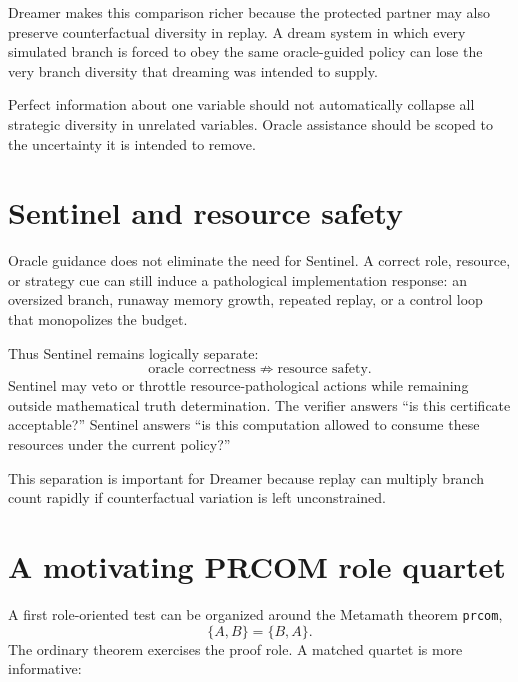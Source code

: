 Dreamer makes this comparison richer because the protected partner may also preserve counterfactual diversity in replay. A dream system in which every simulated branch is forced to obey the same oracle-guided policy can lose the very branch diversity that dreaming was intended to supply.

\begin{principle}
Perfect information about one variable should not automatically collapse all strategic diversity in unrelated variables. Oracle assistance should be scoped to the uncertainty it is intended to remove.
\end{principle}

\section{Sentinel and resource safety}

Oracle guidance does not eliminate the need for Sentinel. A correct role, resource, or strategy cue can still induce a pathological implementation response: an oversized branch, runaway memory growth, repeated replay, or a control loop that monopolizes the budget.

Thus Sentinel remains logically separate:
\begin{equation}
\text{oracle correctness}\not\Rightarrow\text{resource safety}.
\end{equation}
Sentinel may veto or throttle resource-pathological actions while remaining outside mathematical truth determination. The verifier answers ``is this certificate acceptable?'' Sentinel answers ``is this computation allowed to consume these resources under the current policy?''

This separation is important for Dreamer because replay can multiply branch count rapidly if counterfactual variation is left unconstrained.

\section{A motivating PRCOM role quartet}

A first role-oriented test can be organized around the Metamath theorem \texttt{prcom},
\begin{equation}
\{A,B\}=\{B,A\}.
\end{equation}
The ordinary theorem exercises the proof role. A matched quartet is more informative:

